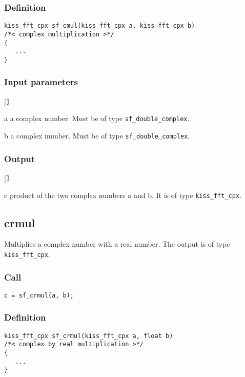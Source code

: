 \subsubsection*{Definition}
\begin{verbatim}
kiss_fft_cpx sf_cmul(kiss_fft_cpx a, kiss_fft_cpx b)
/*< complex multiplication >*/
{
   ...
}
\end{verbatim}

\subsubsection*{Input parameters}
\begin{desclist}{\tt }{\quad}[\tt ]
   \setlength\itemsep{0pt}
   \item[a] a complex number. Must be of type \texttt{sf\_double\_complex}.  
   \item[b] a complex number. Must be of type \texttt{sf\_double\_complex}.  
\end{desclist}

\subsubsection*{Output}
\begin{desclist}{\tt }{\quad}[\tt ]
   \setlength\itemsep{0pt}
   \item[c] product of the two complex numbers a and b. It is of type \texttt{kiss\_fft\_cpx}.
\end{desclist}




\subsection{{crmul}}
Multiplies a complex number with a real number. The output is of type \texttt{kiss\_fft\_cpx}.

\subsubsection*{Call}
\begin{verbatim}c = sf_crmul(a, b);\end{verbatim}

\subsubsection*{Definition}
\begin{verbatim}
kiss_fft_cpx sf_crmul(kiss_fft_cpx a, float b)
/*< complex by real multiplication >*/
{
   ...
}
\end{verbatim}

